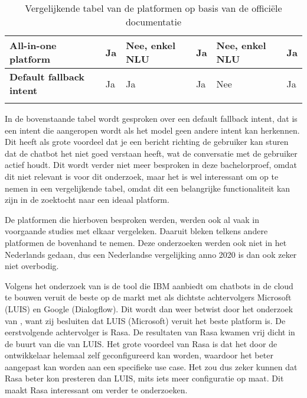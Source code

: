\begin{center}
\begin{longtable}{| P{2.2cm} | p{2.2cm} |  p{2.2cm} | p{2.2cm} | p{2.2cm} | p{2.2cm} |}
        \textbf{All-in-one platform}                                   & Ja                                                                      & Nee, enkel NLU                 & Ja                                           & Nee, enkel NLU                         & Ja                                            \\  \hline
        \textbf{Default fallback intent}                               & Ja                                                                      & Ja                             & Ja                                           & Nee                                    & Ja   \\ \hline    
        \caption{Vergelijkende tabel van de platformen op basis van de officiële documentatie}                                    
    \end{longtable}
\label{tbl:platformen}
\end{center}

In de bovenstaande tabel wordt gesproken over een default fallback intent, dat is een intent die aangeropen wordt als het model geen andere intent kan herkennen. Dit heeft als grote voordeel dat je een bericht richting de gebruiker kan sturen dat de chatbot het niet goed verstaan heeft, wat de conversatie met de gebruiker actief houdt. Dit wordt verder niet meer besproken in deze bachelorproef, omdat dit niet relevant is voor dit onderzoek, maar het is wel interessant om op te nemen in een vergelijkende tabel, omdat dit een belangrijke functionaliteit kan zijn in de zoektocht naar een ideaal platform.

De platformen die hierboven besproken werden, werden ook al vaak in voorgaande studies met elkaar vergeleken. Daaruit bleken telkens andere platformen de bovenhand te nemen. Deze onderzoeken werden ook niet in het Nederlands gedaan, dus een Nederlandse vergelijking anno 2020 is dan ook zeker niet overbodig.

Volgens het onderzoek van \textcite{Russis2018} is de tool die IBM aanbiedt om chatbots in de cloud te bouwen veruit de beste op de markt met als dichtste achtervolgers Microsoft (LUIS) en Google (Dialogflow). Dit wordt dan weer betwist door het onderzoek van \textcite{Langen2017}, want zij besluiten dat LUIS (Microsoft) veruit het beste platform is. De eerstvolgende achtervolger is Rasa. De resultaten van Rasa kwamen vrij dicht in de buurt van die van LUIS. Het grote voordeel van Rasa is dat het door de ontwikkelaar helemaal zelf geconfigureerd kan worden, waardoor het beter aangepast kan worden aan een specifieke use case. Het zou dus zeker kunnen dat Rasa beter kon presteren dan LUIS, mits iets meer configuratie op maat. Dit maakt Rasa interessant om verder te onderzoeken.

